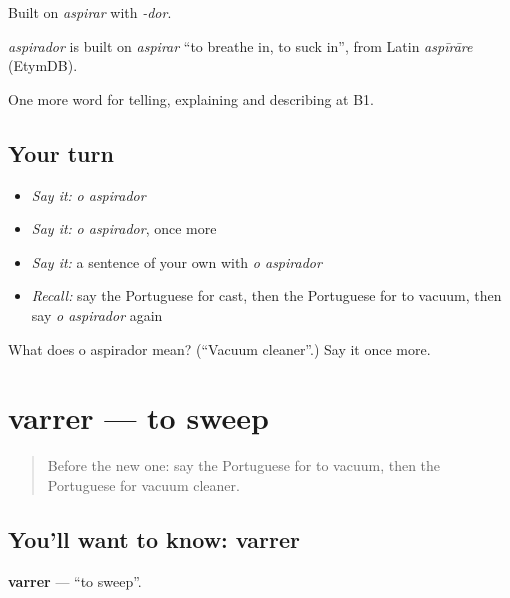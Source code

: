 Built on \emph{aspirar} with \emph{-dor}.

\begin{cousinweb}
\emph{aspirador} is built on \emph{aspirar} \textquotedblleft{}to breathe in, to suck in\textquotedblright{}, from Latin \emph{aspīrāre} (EtymDB).
\end{cousinweb}

\begin{grammarlens}[title={What you've built}]
One more word for telling, explaining and describing at B1.
\end{grammarlens}

\subsection*{Your turn}
\begin{itemize}
\raggedright
  \item \emph{Say it:} \emph{o aspirador}
  \item \emph{Say it:} \emph{o aspirador}, once more
  \item \emph{Say it:} a sentence of your own with \emph{o aspirador}
  \item \emph{Recall:} say the Portuguese for cast, then the Portuguese for to vacuum, then say \emph{o aspirador} again
\end{itemize}

\begin{tcolorbox}[breakable,colback=teal!4,colframe=teal!35!black,title={Before you move on}]
What does o aspirador mean? (\textquotedblleft{}Vacuum cleaner\textquotedblright{}.) Say it once more.
\end{tcolorbox}
\section[varrer]{varrer — to sweep}

\label{lesson:PT-C528-varrer}



\begin{quote}
Before the new one: say the Portuguese for to vacuum, then the Portuguese for vacuum cleaner.
\end{quote}

\subsection*{You'll want to know: varrer}
\textbf{varrer} — \textquotedblleft{}to sweep\textquotedblright{}.

